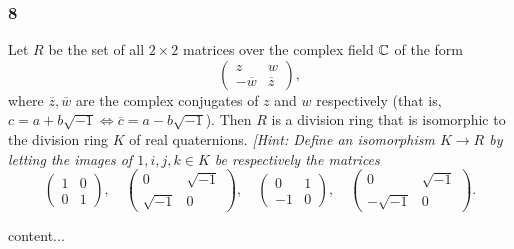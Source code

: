 \subsubsection*{8}
\begin{graybox}
	Let $R$ be the set of all $2 \times 2$ matrices over the complex field $\mathbb{C}$ of the form
	\[
	\begin{pmatrix}
		z & w \\
		-\overline{w} & \overline{z}
	\end{pmatrix},
	\]
	where $\overline{z}, \overline{w}$ are the complex conjugates of $z$ and $w$ respectively (that is, $c = a + b\sqrt{-1} \iff \overline{c} = a - b\sqrt{-1}$). Then $R$ is a division ring that is isomorphic to the division ring $K$ of real quaternions. \textit{[Hint: Define an isomorphism $K \to R$ by letting the images of $1, i, j, k \in K$ be respectively the matrices}
	\[
	\begin{pmatrix}
		1 & 0 \\
		0 & 1
	\end{pmatrix}, \quad
	\begin{pmatrix}
		0 & \sqrt{-1} \\
		\sqrt{-1} & 0
	\end{pmatrix}, \quad
	\begin{pmatrix}
		0 & 1 \\
		-1 & 0
	\end{pmatrix}, \quad
	\begin{pmatrix}
		0 & \sqrt{-1} \\
		-\sqrt{-1} & 0
	\end{pmatrix}.
	\]
\end{graybox}
\begin{solution}
	content...
\end{solution}

